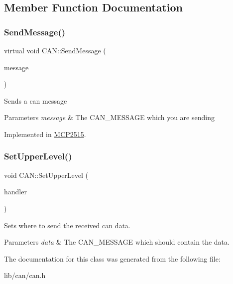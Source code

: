 \subsection{Member Function Documentation}
\hypertarget{class_c_a_n_a6d9cf7beee73adaaa0be93426a078612}{}\label{class_c_a_n_a6d9cf7beee73adaaa0be93426a078612} 
\subsubsection{\texorpdfstring{Send\+Message()}{SendMessage()}}
{\footnotesize\ttfamily virtual void C\+A\+N\+::\+Send\+Message (\begin{DoxyParamCaption}\item[{\hyperlink{struct_can_message}{Can\+Message} \&}]{message }\end{DoxyParamCaption})\hspace{0.3cm}{\ttfamily [pure virtual]}}

Sends a can message 
\begin{DoxyParams}{Parameters}
{\em message} & The C\+A\+N\+\_\+\+M\+E\+S\+S\+A\+GE which you are sending \\
\hline
\end{DoxyParams}


Implemented in \hyperlink{class_m_c_p2515_ade69da887eb514530ef5f73c0c3b0130}{M\+C\+P2515}.

\hypertarget{class_c_a_n_ad4e5c357a39aea0a0535e1213c519570}{}\label{class_c_a_n_ad4e5c357a39aea0a0535e1213c519570} 
\subsubsection{\texorpdfstring{Set\+Upper\+Level()}{SetUpperLevel()}}
{\footnotesize\ttfamily void C\+A\+N\+::\+Set\+Upper\+Level (\begin{DoxyParamCaption}\item[{void($\ast$)(\hyperlink{struct_can_message}{Can\+Message} \&data)}]{handler }\end{DoxyParamCaption})\hspace{0.3cm}{\ttfamily [inline]}}

Sets where to send the received can data. 
\begin{DoxyParams}{Parameters}
{\em data} & The C\+A\+N\+\_\+\+M\+E\+S\+S\+A\+GE which should contain the data. \\
\hline
\end{DoxyParams}


The documentation for this class was generated from the following file\+:\begin{DoxyCompactItemize}
\item 
lib/can/can.\+h\end{DoxyCompactItemize}
